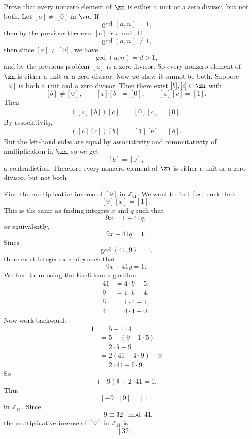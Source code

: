 \begin{problem}{
    Prove that every nonzero element of $\zn$ is either a unit or a zero divisor, but not both.
}
    Let $[a]\neq [0]$ in $\zn$.
    If
    \[
        \gcd(a,n)=1,
    \]
    then by the previous theorem $[a]$ is a unit.
    If
    \[
        \gcd(a,n)\neq 1,
    \]
    then since $[a]\neq [0]$, we have
    \[
        \gcd(a,n)=d>1,
    \]
    and by the previous problem $[a]$ is a zero divisor.
    So every nonzero element of $\zn$ is either a unit or a zero divisor.
    Now we show it cannot be both.
    Suppose $[a]$ is both a unit and a zero divisor.
    Then there exist $[b],[c]\in\zn$ with
    \[
        [b]\neq [0],
        \qquad
        [a][b]=[0],
        \qquad
        [a][c]=[1].
    \]
    Then
    \begin{align*}
        ([a][b])[c] &= [0][c]=[0].
    \end{align*}
    By associativity,
    \begin{align*}
        ([a][c])[b] &= [1][b]=[b].
    \end{align*}
    But the left-hand sides are equal by associativity and commutativity of multiplication in $\zn$, so we get
    \[
        [b]=[0],
    \]
    a contradiction.
    Therefore every nonzero element of $\zn$ is either a unit or a zero divisor, but not both.
\end{problem}

\begin{problem}{
    Find the multiplicative inverse of $[9]$ in $\mathbb{Z}_{41}$.
}
    We want to find $[x]$ such that
    \[
        [9][x]=[1].
    \]
    This is the same as finding integers $x$ and $q$ such that
    \[
        9x=1+41q,
    \]
    or equivalently,
    \[
        9x-41q=1.
    \]
    Since
    \[
        \gcd(41,9)=1,
    \]
    there exist integers $x$ and $y$ such that
    \[
        9x+41y=1.
    \]
    We find them using the Euclidean algorithm:
    \begin{align*}
        41 &= 4\cdot 9 + 5,\\
        9 &= 1\cdot 5 + 4,\\
        5 &= 1\cdot 4 + 1,\\
        4 &= 4\cdot 1 + 0.
    \end{align*}
    Now work backward:
    \begin{align*}
        1 &= 5-1\cdot 4\\
        &= 5-(9-1\cdot 5)\\
        &= 2\cdot 5-9\\
        &= 2(41-4\cdot 9)-9\\
        &= 2\cdot 41-9\cdot 9.
    \end{align*}
    So
    \[
        (-9)9 + 2\cdot 41 = 1.
    \]
    Thus
    \[
        [-9][9]=[1]
    \]
    in $\mathbb{Z}_{41}$.
    Since
    \[
        -9\equiv 32\mod {41},
    \]
    the multiplicative inverse of $[9]$ in $\mathbb{Z}_{41}$ is
    \[
        [32].
    \]
\end{problem}